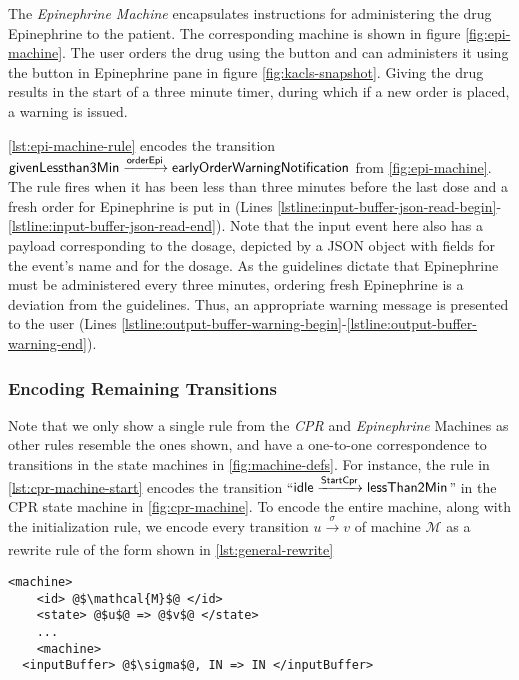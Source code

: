 The \textit{Epinephrine Machine} encapsulates instructions for administering
the drug Epinephrine to the patient. The corresponding machine is shown in figure
\ref{fig:epi-machine}.  The user orders the drug using the
 button and can administers it using the  button in
Epinephrine pane in figure \ref{fig:kacls-snapshot}. Giving the drug results in the
start of a three minute timer, during which if a new order is placed, a warning
is issued.

\autoref{lst:epi-machine-rule} encodes the transition
$\text{\sffamily givenLessthan3Min} \xrightarrow[]{\text{\sffamily orderEpi}}
\text{\sffamily earlyOrderWarningNotification}$ from \autoref{fig:epi-machine}.
The rule fires when it has been less than three minutes
before the last dose and a fresh order for
Epinephrine is put in (Lines
\ref{lstline:input-buffer-json-read-begin}-\ref{lstline:input-buffer-json-read-end}).
Note that the input event here also has a payload corresponding to the dosage,
depicted by a JSON object with fields  for the event's name
and  for the dosage.
As the guidelines dictate that Epinephrine must be administered
every three minutes, ordering fresh Epinephrine is a deviation from the
guidelines. Thus, an appropriate warning message is presented to the user (Lines
\ref{lstline:output-buffer-warning-begin}-\ref{lstline:output-buffer-warning-end}).

\subsubsection{Encoding Remaining Transitions}
Note that we only show a single rule from the \textit{CPR} and
\textit{Epinephrine} Machines as other rules resemble the ones
shown, and have a one-to-one correspondence to transitions in the
state machines in \autoref{fig:machine-defs}. For instance,
the rule in \autoref{lst:cpr-machine-start} encodes the transition
``$\text{\sffamily idle} \xrightarrow[]{\text{\sffamily StartCpr}} \text{\sffamily lessThan2Min}$'' in the
CPR state machine in \autoref{fig:cpr-machine}. To encode the entire machine,
along with the initialization rule,
we encode every transition $u \xrightarrow[]{\sigma} v$
of machine $\mathcal{M}$ as a rewrite rule of the form shown in
\autoref{lst:general-rewrite}
\begin{lstlisting}[float=h,
  frame=single,
  style=ksty,
  language=k,
  label={lst:general-rewrite},
  caption={Transitions as $\K$-Rules}
]
  <machine>
    <id> @$\mathcal{M}$@ </id>
    <state> @$u$@ => @$v$@ </state>
    ...
    <machine>
  <inputBuffer> @$\sigma$@, IN => IN </inputBuffer>
\end{lstlisting}

